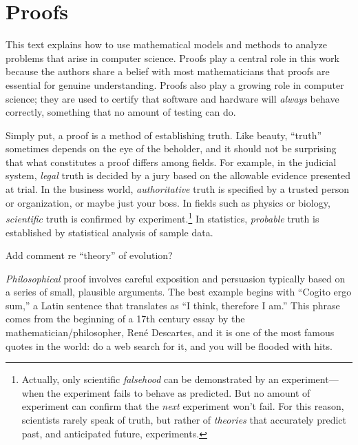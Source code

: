 \part{Proofs}
\label{part:proofs}


\partintro
{}

This text explains how to use mathematical models and methods to analyze
problems that arise in computer science.  Proofs play a central role in
this work because the authors share a belief with most mathematicians that
proofs are essential for genuine understanding.  Proofs also play a
growing role in computer science; they are used to certify that software
and hardware will \emph{always} behave correctly, something that no amount
of testing can do.

Simply put, a proof is a method of establishing truth.  Like beauty,
``truth'' sometimes depends on the eye of the beholder, and it should
not be surprising that what constitutes a proof differs among fields.
For example, in the judicial system, \emph{legal} truth is decided by
a jury based on the allowable evidence presented at trial.  In the
business world, \emph{authoritative} truth is specified by a trusted
person or organization, or maybe just your boss.  In fields such as
physics or biology, \emph{scientific} truth is confirmed by
experiment.\footnote{Actually, only scientific \emph{falsehood} can be
  demonstrated by an experiment---when the experiment fails to behave
  as predicted.  But no amount of experiment can confirm that the
  \emph{next} experiment won't fail.  For this reason, scientists
  rarely speak of truth, but rather of \emph{theories} that accurately
  predict past, and anticipated future, experiments.}  In statistics,
\emph{probable} truth is established by statistical analysis of sample
data.

\begin{editingnotes}
Add comment re ``theory'' of evolution?
\end{editingnotes}

\emph{Philosophical} proof involves careful exposition and persuasion
typically based on a series of small, plausible arguments.  The best
example begins with ``Cogito ergo sum,'' a Latin sentence that
translates as ``I think, therefore I am.''  This phrase comes from the
beginning of a 17th century essay by the mathematician/philosopher,
Ren\'e Descartes, and it is one of the most famous quotes in the
world: do a web search for it, and you will be flooded with
hits.

